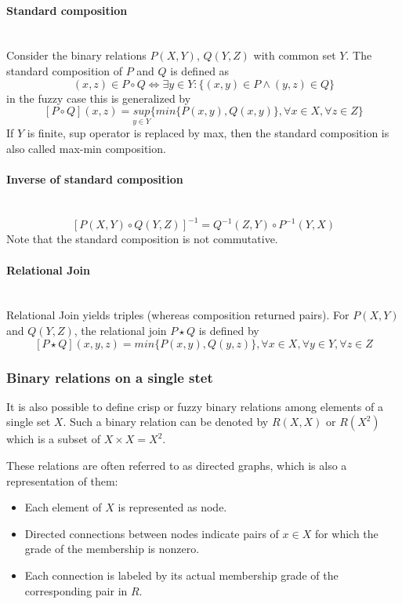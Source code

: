 \documentclass{article}
\begin{document}
\paragraph{Standard composition}\mbox{}\\
Consider the binary relations $P(X,Y)$, $Q(Y,Z)$ with common set $Y$. The standard composition
of $P$ and $Q$ is defined as
$$(x,z)\in P\circ Q\Leftrightarrow\exists y\in Y:\{(x,y)\in P\land (y,z)\in Q\}$$
in the fuzzy case this is generalized by
$$[P\circ Q](x,z)=\underset{y \in Y}{sup}\{min\{P(x,y),Q(x,y)\},\forall x\in X, \forall z\in Z\}$$
If $Y$ is finite, sup operator is replaced by max, then the standard composition is also called max-min
composition.

\paragraph{Inverse of standard composition}\mbox{}\\
$$[P(X,Y)\circ Q(Y,Z)]^{-1}=Q^{-1}(Z,Y)\circ P^{-1}(Y,X)$$
Note that the standard composition is not commutative.

\paragraph{Relational Join}\mbox{}\\
Relational Join yields triples (whereas composition returned pairs). For $P(X,Y)$ and
$Q(Y,Z)$, the relational join $P\star Q$ is defined by
$$[P\star Q](x,y,z)=min\{P(x,y),Q(y,z)\}, \forall x \in X, \forall y \in Y,\forall z\in Z$$

\subsubsection{Binary relations on a single stet}
It is also possible to define crisp or fuzzy binary relations among elements of a single set $X$.
Such a binary relation can be denoted by $R(X,X)$ or $R(X^2)$ which is a subset of $X\times X=X^2$.

These relations are often referred to as directed graphs, which is also a representation of them:
\begin{itemize}
    \item Each element of $X$ is represented as node.
    \item Directed connections between nodes indicate pairs of $x\in X$ for which the grade
          of the membership is nonzero.
    \item Each connection is labeled by its actual membership grade of the corresponding pair
          in $R$.
\end{itemize}
\end{document}
